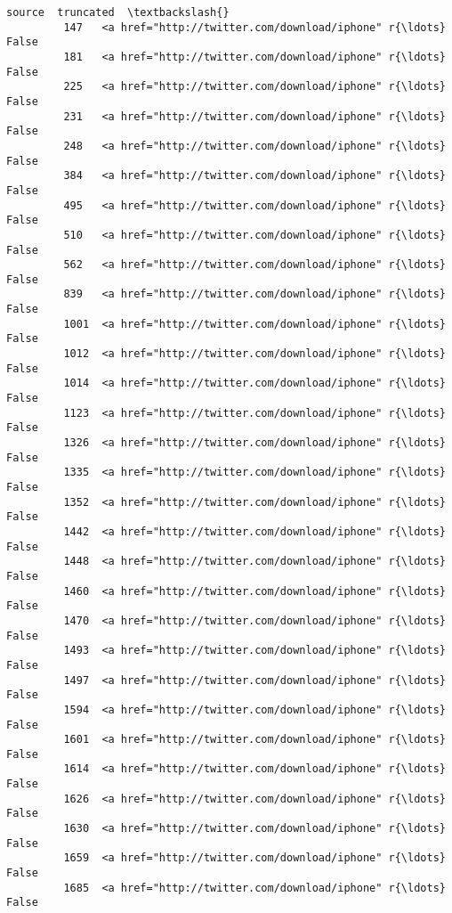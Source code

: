 \documentclass[11pt]{article}
\begin{document}
\begin{Verbatim}[commandchars=\\\{\}]
                                                          source  truncated  \textbackslash{}
         147   <a href="http://twitter.com/download/iphone" r{\ldots}      False   
         181   <a href="http://twitter.com/download/iphone" r{\ldots}      False   
         225   <a href="http://twitter.com/download/iphone" r{\ldots}      False   
         231   <a href="http://twitter.com/download/iphone" r{\ldots}      False   
         248   <a href="http://twitter.com/download/iphone" r{\ldots}      False   
         384   <a href="http://twitter.com/download/iphone" r{\ldots}      False   
         495   <a href="http://twitter.com/download/iphone" r{\ldots}      False   
         510   <a href="http://twitter.com/download/iphone" r{\ldots}      False   
         562   <a href="http://twitter.com/download/iphone" r{\ldots}      False   
         839   <a href="http://twitter.com/download/iphone" r{\ldots}      False   
         1001  <a href="http://twitter.com/download/iphone" r{\ldots}      False   
         1012  <a href="http://twitter.com/download/iphone" r{\ldots}      False   
         1014  <a href="http://twitter.com/download/iphone" r{\ldots}      False   
         1123  <a href="http://twitter.com/download/iphone" r{\ldots}      False   
         1326  <a href="http://twitter.com/download/iphone" r{\ldots}      False   
         1335  <a href="http://twitter.com/download/iphone" r{\ldots}      False   
         1352  <a href="http://twitter.com/download/iphone" r{\ldots}      False   
         1442  <a href="http://twitter.com/download/iphone" r{\ldots}      False   
         1448  <a href="http://twitter.com/download/iphone" r{\ldots}      False   
         1460  <a href="http://twitter.com/download/iphone" r{\ldots}      False   
         1470  <a href="http://twitter.com/download/iphone" r{\ldots}      False   
         1493  <a href="http://twitter.com/download/iphone" r{\ldots}      False   
         1497  <a href="http://twitter.com/download/iphone" r{\ldots}      False   
         1594  <a href="http://twitter.com/download/iphone" r{\ldots}      False   
         1601  <a href="http://twitter.com/download/iphone" r{\ldots}      False   
         1614  <a href="http://twitter.com/download/iphone" r{\ldots}      False   
         1626  <a href="http://twitter.com/download/iphone" r{\ldots}      False   
         1630  <a href="http://twitter.com/download/iphone" r{\ldots}      False   
         1659  <a href="http://twitter.com/download/iphone" r{\ldots}      False   
         1685  <a href="http://twitter.com/download/iphone" r{\ldots}      False   

\end{Verbatim}
\end{document}
